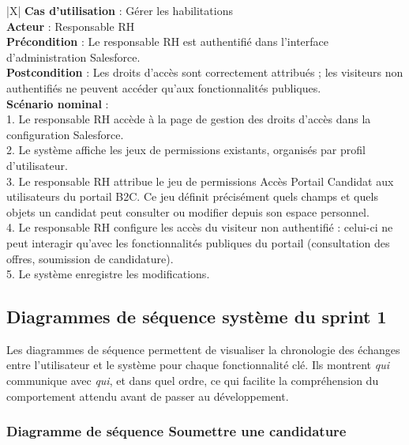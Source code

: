 \begin{xltabular}{\linewidth}{|X|}
    \hline
    \textbf{Cas d'utilisation} : Gérer les habilitations \\
    \hline
    \textbf{Acteur} : Responsable RH \\
    \hline
    \textbf{Précondition} : Le responsable RH est authentifié dans l'interface d'administration Salesforce. \\
    \hline
    \textbf{Postcondition} : Les droits d'accès sont correctement attribués ; les visiteurs non authentifiés ne peuvent accéder qu'aux fonctionnalités publiques. \\
    \hline
    \textbf{Scénario nominal} : \\
    1. Le responsable RH accède à la page de gestion des droits d'accès dans la configuration Salesforce. \\
    2. Le système affiche les jeux de permissions existants, organisés par profil d'utilisateur. \\
    3. Le responsable RH attribue le jeu de permissions \og Accès Portail Candidat \fg aux utilisateurs du portail B2C. Ce jeu définit précisément quels champs et quels objets un candidat peut consulter ou modifier depuis son espace personnel. \\
    4. Le responsable RH configure les accès du visiteur non authentifié : celui-ci ne peut interagir qu'avec les fonctionnalités publiques du portail (consultation des offres, soumission de candidature). \\
    5. Le système enregistre les modifications. \\
    \hline
\caption{Description textuelle du CU « Gérer les habilitations »}
\label{tab:cu_gerer_habilitations}
\end{xltabular}

\subsection{Diagrammes de séquence système du sprint 1}

Les diagrammes de séquence permettent de visualiser la chronologie des échanges entre l'utilisateur et le système pour chaque fonctionnalité clé. Ils montrent \textit{qui} communique avec \textit{qui}, et dans quel ordre, ce qui facilite la compréhension du comportement attendu avant de passer au développement.

\subsubsection{Diagramme de séquence \og Soumettre une candidature \fg}

